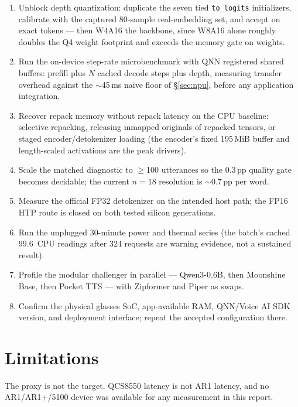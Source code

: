 \documentclass[10pt,twocolumn,letterpaper]{article}
\begin{document}
\begin{enumerate}\itemsep2pt \parskip0pt
\item Unblock depth quantization: duplicate the seven tied
      \texttt{to\_logits} initializers, calibrate with the captured 80-sample
      real-embedding set, and accept on exact tokens --- then W4A16 the
      backbone, since W8A16 alone roughly doubles the Q4 weight footprint and
      exceeds the memory gate on weights.
\item Run the on-device step-rate microbenchmark with QNN registered shared
      buffers: prefill plus $N$ cached decode steps plus depth, measuring
      transfer overhead against the $\sim$45\,ms naive floor of
      \S\ref{sec:npu}, before any application integration.
\item Recover repack memory without repack latency on the CPU baseline:
      selective repacking, releasing mmapped originals of repacked tensors, or
      staged encoder/detokenizer loading (the encoder's fixed 195\,MiB buffer
      and length-scaled activations are the peak drivers).
\item Scale the matched diagnostic to $\geq$100 utterances so the 0.3\,pp
      quality gate becomes decidable; the current $n{=}18$ resolution is
      $\sim$0.7\,pp per word.
\item Measure the official FP32 detokenizer on the intended host path; the
      FP16 HTP route is closed on both tested silicon generations.
\item Run the unplugged 30-minute power and thermal series (the batch's
      cached 99.6\,\textcelsius{} CPU readings after 324 requests are warning
      evidence, not a sustained result).
\item Profile the modular challenger in parallel --- Qwen3-0.6B, then
      Moonshine Base, then Pocket TTS --- with Zipformer and Piper as swaps.
\item Confirm the physical glasses SoC, app-available RAM, QNN/Voice AI SDK
      version, and deployment interface; repeat the accepted configuration
      there.
\end{enumerate}

\section{Limitations}
\label{sec:limits}

The proxy is not the target. QCS8550 latency is not AR1 latency, and no
AR1/AR1+/5100 device was available for any measurement in this report.
\end{document}
